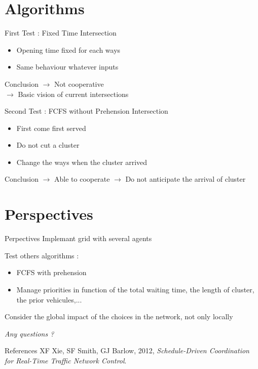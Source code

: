 \documentclass[]{beamer}
\begin{document}
\section{Algorithms}
\begin{frame}{First Test : Fixed Time Intersection}
 \begin{itemize}
  \item Opening time fixed for each ways
  \item Same behaviour whatever inputs
 \end{itemize}
 \begin{block}{Conclusion}
  $\rightarrow$ Not cooperative\\
  $\rightarrow$ Basic vision of current intersections
 \end{block}
\end{frame}

\begin{frame}{Second Test : FCFS without Prehension Intersection}
 \begin{itemize}
  \item First come first served
  \item Do not cut a cluster
  \item Change the ways when the cluster arrived
 \end{itemize}
 \begin{block}{Conclusion}
  $\rightarrow$ Able to cooperate
  $\rightarrow$ Do not anticipate the arrival of cluster
 \end{block}
\end{frame}

\section{Perspectives}
\begin{frame}{Perpectives}
Implemant grid with several agents\vspace{0.5cm}

Test others algorithms :
 \begin{itemize}
  \item FCFS with prehension
  \item Manage priorities in function of the total waiting time, the length of cluster, the prior vehicules,...
 \end{itemize}
 \vspace{0.5cm}
Consider the global impact of the choices in the network, not only locally
\end{frame}

\begin{frame}
\centering \LARGE
  \emph{Any questions ?}
\end{frame}

\begin{frame}{References}
XF Xie, SF Smith, GJ Barlow, 2012, \emph{Schedule-Driven Coordination for Real-Time Traffic Network Control}.
\end{frame}
\end{document}
